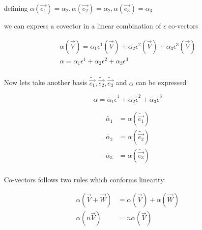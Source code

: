 \documentclass{article}
\begin{document}
	defining $\alpha(\overrightarrow{e_{1}}) = \alpha_{2},\alpha(\overrightarrow{e_{2}}) = \alpha_{2},\alpha(\overrightarrow{e_{3}}) = \alpha_{3}$ 
	
	we can express a covector in a linear combination of $\epsilon$ co-vectors
	
	\begin{align*}
		\alpha(\overrightarrow{V}) = \alpha_{1}\epsilon^{1}(\overrightarrow{V}) + \alpha_{2}\epsilon^{2}(\overrightarrow{V}) + \alpha_{3}\epsilon^{3}(\overrightarrow{V})\\
		\alpha = \alpha_{1}\epsilon^{1} + \alpha_{2}\epsilon^{2} + \alpha_{3}\epsilon^{3}\\
	\end{align*}

	Now lets take another basis $\widetilde{\overrightarrow{e_{1}}},\widetilde{\overrightarrow{e_{2}}},\widetilde{\overrightarrow{e_{3}}}$ and $\alpha$ can be expressed
	
	$$\alpha = \widetilde{\alpha_{1}}\widetilde{\epsilon}^{1} + \widetilde{\alpha_{2}}\widetilde{\epsilon}^{2} + \widetilde{\alpha_{3}}\widetilde{\epsilon}^{3}$$
	
	\begin{center}
		\begin{align*}
			\widetilde{\alpha_{1}} &= \alpha(\widetilde{\overrightarrow{e_{1}}})\\
			\widetilde{\alpha_{2}} &= \alpha(\widetilde{\overrightarrow{e_{2}}})\\
			\widetilde{\alpha_{3}} &= \alpha(\widetilde{\overrightarrow{e_{3}}})\\
		\end{align*}
	\end{center}

	Co-vectors follows two rules which conforms linearity:
	
	\begin{tcolorbox}
		\begin{center}
			\begin{equation}
				\begin{aligned}
					\alpha(\overrightarrow{V}+\overrightarrow{W}) &= \alpha(\overrightarrow{V}) + \alpha(\overrightarrow{W})\\
					\alpha(n\overrightarrow{V}) &= n\alpha(\overrightarrow{V}) 
				\end{aligned}\label{eq4}
			\end{equation} 
		\end{center}
	\end{tcolorbox}	
\end{document}
